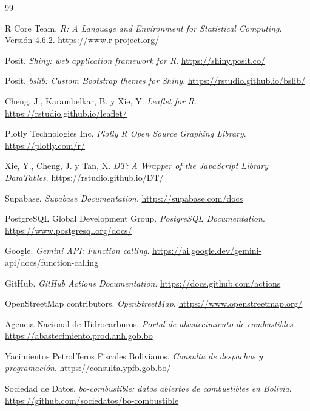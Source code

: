 \documentclass[12pt,a4paper]{article}
\begin{document}
\newpage
{}
\begin{thebibliography}{99}

R Core Team.
\emph{R: A Language and Environment for Statistical Computing}.
Versión 4.6.2.
\url{https://www.r-project.org/}

Posit.
\emph{Shiny: web application framework for R}.
\url{https://shiny.posit.co/}

Posit.
\emph{bslib: Custom Bootstrap themes for Shiny}.
\url{https://rstudio.github.io/bslib/}

Cheng, J., Karambelkar, B. y Xie, Y.
\emph{Leaflet for R}.
\url{https://rstudio.github.io/leaflet/}

Plotly Technologies Inc.
\emph{Plotly R Open Source Graphing Library}.
\url{https://plotly.com/r/}

Xie, Y., Cheng, J. y Tan, X.
\emph{DT: A Wrapper of the JavaScript Library DataTables}.
\url{https://rstudio.github.io/DT/}

Supabase.
\emph{Supabase Documentation}.
\url{https://supabase.com/docs}

PostgreSQL Global Development Group.
\emph{PostgreSQL Documentation}.
\url{https://www.postgresql.org/docs/}

Google.
\emph{Gemini API: Function calling}.
\url{https://ai.google.dev/gemini-api/docs/function-calling}

GitHub.
\emph{GitHub Actions Documentation}.
\url{https://docs.github.com/actions}

OpenStreetMap contributors.
\emph{OpenStreetMap}.
\url{https://www.openstreetmap.org/}

Agencia Nacional de Hidrocarburos.
\emph{Portal de abastecimiento de combustibles}.
\url{https://abastecimiento.prod.anh.gob.bo}

Yacimientos Petrolíferos Fiscales Bolivianos.
\emph{Consulta de despachos y programación}.
\url{https://consulta.ypfb.gob.bo/}

Sociedad de Datos.
\emph{bo-combustible: datos abiertos de combustibles en Bolivia}.
\url{https://github.com/sociedatos/bo-combustible}

\end{thebibliography}
\end{document}
